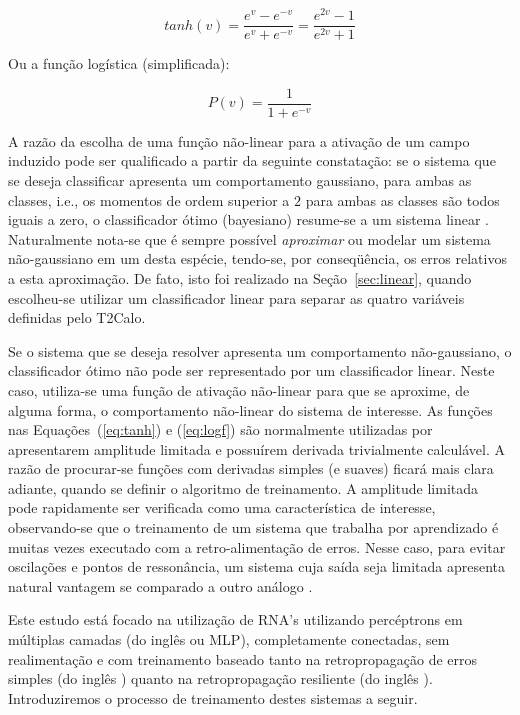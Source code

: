 \begin{equation}
tanh(v) = \frac{e^v - e^{-v}}{e^v + e^{-v}} = \frac{e^{2v} - 1}{e^{2v} + 1}
\label{eq:tanh}
\end{equation}

Ou a função logística (simplificada):

\begin{equation}
P(v) = \frac{1}{1 + e^{-v}}
\label{eq:logf}
\end{equation}

A razão da escolha de uma função não-linear para a ativação de um campo
induzido pode ser qualificado a partir da seguinte constatação: se o sistema
que se deseja classificar apresenta um comportamento gaussiano, para ambas as
classes, i.e., os momentos de ordem superior a $2$ para ambas as classes são
todos iguais a zero, o classificador ótimo (bayesiano) resume-se a um sistema
linear \cite{haykin}. Naturalmente nota-se que é sempre possível
\textit{aproximar} ou modelar um sistema não-gaussiano em um desta espécie,
tendo-se, por conseqüência, os erros relativos a esta aproximação. De fato,
isto foi realizado na Seção~\ref{sec:linear}, quando escolheu-se utilizar um
classificador linear para separar as quatro variáveis definidas pelo T2Calo.

Se o sistema que se deseja resolver apresenta um comportamento não-gaussiano,
o classificador ótimo não pode ser representado por um classificador
linear. Neste caso, utiliza-se uma função de ativação não-linear para que se
aproxime, de alguma forma, o comportamento não-linear do sistema de interesse.
As funções nas Equações~(\ref{eq:tanh}) e (\ref{eq:logf}) são normalmente
utilizadas por apresentarem amplitude limitada e possuírem derivada
trivialmente calculável. A razão de procurar-se funções com derivadas simples
(e suaves) ficará mais clara adiante, quando se definir o algoritmo de
treinamento. A amplitude limitada pode rapidamente ser verificada como uma
característica de interesse, observando-se que o treinamento de um sistema que
trabalha por aprendizado é muitas vezes executado com a retro-alimentação de
erros. Nesse caso, para evitar oscilações e pontos de ressonância, um sistema
cuja saída seja limitada apresenta natural vantagem se comparado a outro
análogo \cite{haykin}.

Este estudo está focado na utilização de RNA's utilizando percéptrons em
múltiplas camadas (do inglês  ou MLP),
completamente conectadas, sem realimentação e com treinamento baseado tanto na
retropropagação de erros simples (do inglês ) quanto na
retropropagação resiliente (do inglês ). Introduziremos o processo de treinamento destes sistemas a
seguir.

